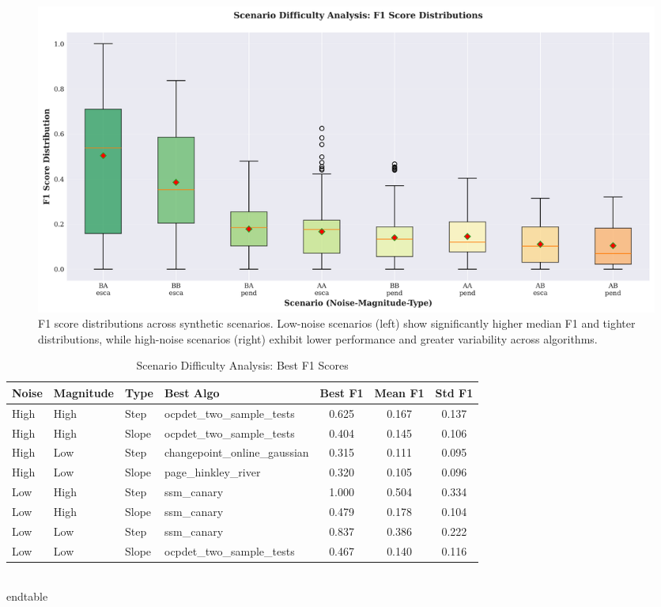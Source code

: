 \begin{table}[H]
\begin{figure}[htbp]
\centering
\includegraphics[width=\textwidth]{figures/fig_scenario_difficulty.png}
\caption{F1 score distributions across synthetic scenarios. Low-noise scenarios (left) show significantly higher median F1 and tighter distributions, while high-noise scenarios (right) exhibit lower performance and greater variability across algorithms.}
\label{fig:scenario_difficulty}
\end{figure}

\begin{table}[H]
\centering
\caption{Scenario Difficulty Analysis: Best F1 Scores}
\label{tab:scenario_matrix}
\small
\begin{tabular}{llllccc}
\toprule
\textbf{Noise} & \textbf{Magnitude} & \textbf{Type} & \textbf{Best Algo} & \textbf{Best F1} & \textbf{Mean F1} & \textbf{Std F1} \\
\midrule
High & High & Step & ocpdet\_two\_sample\_tests & 0.625 & 0.167 & 0.137 \\
High & High & Slope & ocpdet\_two\_sample\_tests & 0.404 & 0.145 & 0.106 \\
High & Low & Step & changepoint\_online\_gaussian & 0.315 & 0.111 & 0.095 \\
High & Low & Slope & page\_hinkley\_river & 0.320 & 0.105 & 0.096 \\
Low & High & Step & ssm\_canary & 1.000 & 0.504 & 0.334 \\
Low & High & Slope & ssm\_canary & 0.479 & 0.178 & 0.104 \\
Low & Low & Step & ssm\_canary & 0.837 & 0.386 & 0.222 \\
Low & Low & Slope & ocpdet\_two\_sample\_tests & 0.467 & 0.140 & 0.116 \\
\bottomrule
\end{tabular}
\\end{table}


\end{table}
\end{table}
